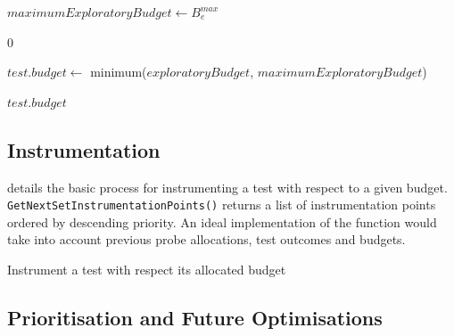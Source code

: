 {\begin{algorithm}[h]
\begin{algorithmic}[1]
	\EndFunction
	\Statex

	\Statex


	\State $maximumExploratoryBudget \gets B_{e}^{max}$

		\Return $0$
	\EndIf

	\State $test.budget \gets$ minimum($exploratoryBudget$,
	$maximumExploratoryBudget$)

	\State \Return $test.budget$

	\EndFunction
\end{algorithmic}

\end{algorithm}


\subsection{Instrumentation}

 details the basic process for instrumenting a test
with respect to a given budget. {\tt GetNextSetInstrumentationPoints()} returns
a list of instrumentation points ordered by descending priority. An ideal
implementation of the function would take into account previous probe
allocations, test outcomes and budgets.

\begin{algorithm}[H]
\caption{Instrument a test with respect its allocated budget}
\label{alg:instrument_test}

\begin{algorithmic}

			\Else
			\EndIf
		\EndFor
	\EndWhile

	\EndFunction
\end{algorithmic}

\end{algorithm}


\subsection{Prioritisation and Future Optimisations}

}
